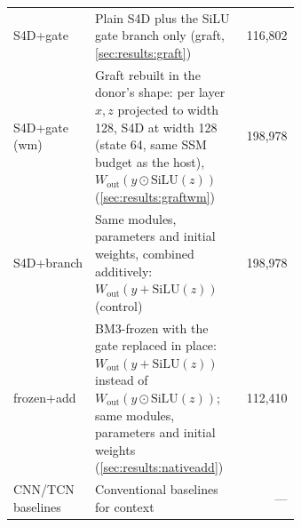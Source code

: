 \begin{longtable}{@{}lp{0.64\linewidth}r@{}}
S4D+gate & Plain S4D plus the SiLU gate branch only (graft, \ref{sec:results:graft}) & 116{,}802 \\
S4D+gate (wm) & Graft rebuilt in the donor's shape: per layer $x, z$ projected to width 128, S4D at width 128 (state 64, same SSM budget as the host), $W_{\mathrm{out}}(y \odot \mathrm{SiLU}(z))$ (\ref{sec:results:graftwm}) & 198{,}978 \\
S4D+branch & Same modules, parameters and initial weights, combined additively: $W_{\mathrm{out}}(y + \mathrm{SiLU}(z))$ (control) & 198{,}978 \\
frozen$+$add & BM3-frozen with the gate replaced in place: $W_{\mathrm{out}}(y + \mathrm{SiLU}(z))$ instead of $W_{\mathrm{out}}(y \odot \mathrm{SiLU}(z))$; same modules, parameters and initial weights (\ref{sec:results:nativeadd}) & 112{,}410 \\
CNN/TCN baselines & Conventional baselines for context & --- \\
\end{longtable}
\endgroup

